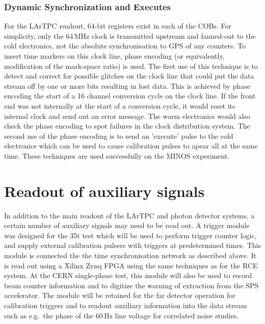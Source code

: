 \subsubsection{Dynamic Synchronization and Executes}

For the LArTPC readout, 64-bit registers exist in each of the COBs.
For simplicity, only the 64\,MHz clock is transmitted upstream and
fanned-out to the cold electronics, not the absolute synchronisation
to GPS of any counters.  To insert time markers on this clock line,
phase encoding (or equivalently, modification of the mark-space ratio)
is used.  The first use of this technique is to detect and correct for
possible glitches on the clock line that could put the data stream off
by one or more bits resulting in lost data.  This is achieved by phase
encoding the start of a 16 channel conversion cycle on the clock line.
If the front end was not internally at the start of a conversion
cycle, it would reset its internal clock and send out an error
message.  The warm electronics would also check the phase encoding to
spot failures in the clock distribution system.  The second use of the
phase encoding is to send an 'execute' pulse to the cold electronics
which can be used to cause calibration pulses to apear all at the same
time.  These techniques are used successfully on the MINOS experiment.

\section{Readout of auxiliary signals}
\label{sec:daq_penn}

In addition to the main readout of the LArTPC and photon detector
systems, a certain number of auxiliary signals may need to be read
out.  A trigger module was designed for the 35t test which will be
used to perform trigger counter logic, and supply external calibration
pulsers with triggers at predetermined times.  This module is
connected the the time synchronisation network as described above.  It
is read out using a Xilinx Zynq FPGA using the same techniques as for
the RCE system.   At the CERN single-phase test, this module will also be used to
record beam counter information and to digitize the warning of
extraction from the SPS accelerator.  The module will be retained for
the far detector operation for calibration triggers and to readout auxiliary information into the
data stream such as e.g.\ the phase of the 60\,Hz line voltage for
correlated noise studies.  

